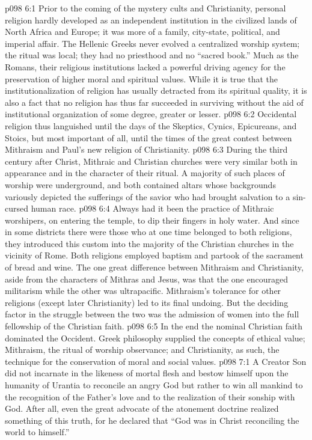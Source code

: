 \vs p098 6:1 Prior to the coming of the mystery cults and Christianity, personal religion hardly developed as an independent institution in the civilized lands of North Africa and Europe; it was more of a family, city\hyp{}state, political, and imperial affair. The Hellenic Greeks never evolved a centralized worship system; the ritual was local; they had no priesthood and no “sacred book.” Much as the Romans, their religious institutions lacked a powerful driving agency for the preservation of higher moral and spiritual values. While it is true that the institutionalization of religion has usually detracted from its spiritual quality, it is also a fact that no religion has thus far succeeded in surviving without the aid of institutional organization of some degree, greater or lesser.
\vs p098 6:2 Occidental religion thus languished until the days of the Skeptics, Cynics, Epicureans, and Stoics, but most important of all, until the times of the great contest between Mithraism and Paul’s new religion of Christianity.
\pc \vs p098 6:3 During the third century after Christ, Mithraic and Christian churches were very similar both in appearance and in the character of their ritual. A majority of such places of worship were underground, and both contained altars whose backgrounds variously depicted the sufferings of the savior who had brought salvation to a sin\hyp{}cursed human race.
\vs p098 6:4 Always had it been the practice of Mithraic worshipers, on entering the temple, to dip their fingers in holy water. And since in some districts there were those who at one time belonged to both religions, they introduced this custom into the majority of the Christian churches in the vicinity of Rome. Both religions employed baptism and partook of the sacrament of bread and wine. The one great difference between Mithraism and Christianity, aside from the characters of Mithras and Jesus, was that the one encouraged militarism while the other was ultrapacific. Mithraism’s tolerance for other religions (except later Christianity) led to its final undoing. But the deciding factor in the struggle between the two was the admission of women into the full fellowship of the Christian faith.
\pc \vs p098 6:5 In the end the nominal Christian faith dominated the Occident. Greek philosophy supplied the concepts of ethical value; Mithraism, the ritual of worship observance; and Christianity, as such, the technique for the conservation of moral and social values.
\vs p098 7:1 A Creator Son did not incarnate in the likeness of mortal flesh and bestow himself upon the humanity of Urantia to reconcile an angry God but rather to win all mankind to the recognition of the Father’s love and to the realization of their sonship with God. After all, even the great advocate of the atonement doctrine realized something of this truth, for he declared that “God was in Christ reconciling the world to himself.”
